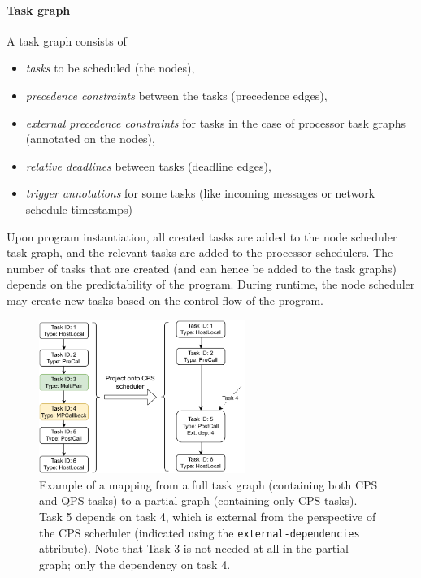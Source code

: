 \paragraph{Task graph}
A task graph consists of 
\begin{itemize}
\item \textit{tasks} to be scheduled (the nodes),
\item \textit{precedence constraints} between the tasks (precedence edges),
\item \textit{external precedence constraints} for tasks in the case of processor task graphs (annotated on the nodes),
\item \textit{relative deadlines} between tasks (deadline edges),
\item \textit{trigger annotations} for some tasks (like incoming messages or network schedule timestamps)
\end{itemize}


Upon program instantiation, all created tasks are added to the node scheduler task graph, and the relevant tasks are added to the processor schedulers.
The number of tasks that are created (and can hence be added to the task graphs) depends on the predictability of the program.
During runtime, the node scheduler may create new tasks based on the control-flow of the program.

\begin{figure}[t]
    \centering
    \includegraphics[width=0.6\textwidth]{figures/qoala/task_graph_partial.pdf}
    \caption{
        Example of a mapping from a full task graph (containing both CPS and QPS tasks) to a partial graph (containing only CPS tasks).
        Task 5 depends on task 4, which is external from the perspective of the CPS scheduler (indicated using the \texttt{external-dependencies} attribute).
        Note that Task 3 is not needed at all in the partial graph; only the dependency on task 4.
    }
    \label{qoala:fig:app:task_graph_partial}
\end{figure}

